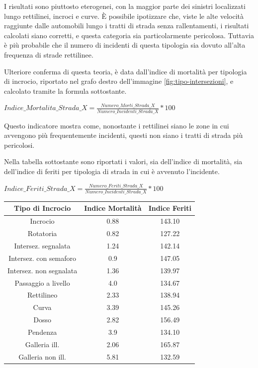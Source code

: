 \documentclass[a4paper,12pt]{report}
\begin{document}
I risultati sono piuttosto eterogenei, con la maggior parte dei sinistri 
localizzati lungo rettilinei, incroci e curve. 
\`E possibile ipotizzare che, viste le alte velocità raggiunte dalle automobili 
lungo i tratti di strada senza rallentamenti, i risultati calcolati siano corretti, 
e questa categoria sia particolarmente pericolosa. 
Tuttavia è più probabile che il numero di incidenti di questa tipologia sia dovuto 
all'alta frequenza di strade rettilinee. 

Ulteriore conferma di questa teoria, è data dall'indice di mortalità per tipologia di incrocio, 
riportato nel grafo destro dell'immagine \ref{fig:tipo-intersezioni}, e calcolato tramite la 
formula sottostante. 

\begin{center}
    $Indice\_Mortalita\_Strada\_X = \displaystyle \frac{Numero\_Morti\_Strada\_X}{Numero\_Incidenti\_Strada\_X} * 100$ 
\end{center}

Questo indicatore mostra come, nonostante i rettilinei siano le zone in cui 
avvengono più frequentemente incidenti, questi non siano i tratti di 
strada più pericolosi. 

Nella tabella sottostante sono riportati i valori, sia dell'indice di mortalità, 
sia dell'indice di feriti per tipologia di strada in cui è avvenuto l'incidente. 

\begin{center}
    $Indice\_Feriti\_Strada\_X = \displaystyle \frac{Numero\_Feriti\_Strada\_X}{Numero\_Incidenti\_Strada\_X} * 100$ 
\end{center}

\begin{center}
    \def\arraystretch{1.5}%
    \begin{tabular}{ |c|c|c| } 
    \hline
    Tipo di Incrocio & Indice Mortalità & Indice Feriti \\ 
    \hline
    \rowcolor{TableGray}
    Incrocio                & 0.88 & 143.10 \\
    Rotatoria               & 0.82 & 127.22 \\
    \rowcolor{TableGray}
    Intersez. segnalata     & 1.24 & 142.14 \\
    Intersez. con semaforo  & 0.9 & 147.05 \\
    \rowcolor{TableGray}
    Intersez. non segnalata & 1.36 & 139.97\\
    Passaggio a livello     & 4.0 & 134.67\\
    \rowcolor{TableGray}
    Rettilineo              & 2.33 & 138.94\\
    Curva                   & 3.39 & 145.26\\
    \rowcolor{TableGray}
    Dosso                   & 2.82 & 156.49\\
    Pendenza                & 3.9 & 134.10\\
    \rowcolor{TableGray}
    Galleria ill.           & 2.06 & 165.87\\
    Galleria non ill.       & 5.81 & 132.59\\
    \hline
    \end{tabular}
\end{center}
\end{document}
